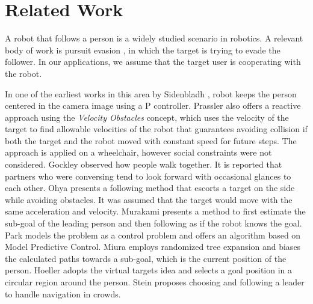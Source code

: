 \section{Related Work}
\label{sec:following_related_work}

A robot that follows a person is a widely studied scenario in robotics. A relevant body of work is pursuit evasion \cite{chung2011search}, in which the target is trying to evade the follower. In our applications, we assume that the target user is cooperating with the robot.

In one of the earliest works in this area by Sidenbladh \cite{sidenbladh1999person}, robot keeps the person centered in the camera image using a P controller. Prassler \cite{prassler2001motion} also offers a reactive approach using the \textit{Velocity Obstacles} concept, which uses the velocity of the target to find allowable velocities of the robot that guarantees avoiding collision if both the target and the robot moved with constant speed for future steps. The approach is applied on a wheelchair, however social constraints were not considered. Gockley \cite{gockley2007developing} observed how people walk together. It is reported that partners who were conversing tend to look forward with occasional glances to each other. Ohya \cite{ohya2002intelligent} presents a following method that escorts a target on the side while avoiding obstacles. It was assumed that the target would move with the same acceleration and velocity. Murakami \cite{murakami2014destination} presents a method to first estimate the sub-goal of the leading person and then following as if the robot knows the goal. Park \cite{park2013autonomous} models the problem as a control problem and offers an algorithm based on Model Predictive Control.
Miura \cite{miura2010development} employs randomized tree expansion and biases the calculated paths towards a sub-goal, which is the current position of the person. Hoeller \cite{hoeller2007accompanying} adopts the virtual targets idea and selects a goal position in a circular region around the person. Stein \cite{stein2013navigating} proposes choosing and following a leader to handle navigation in crowds.

